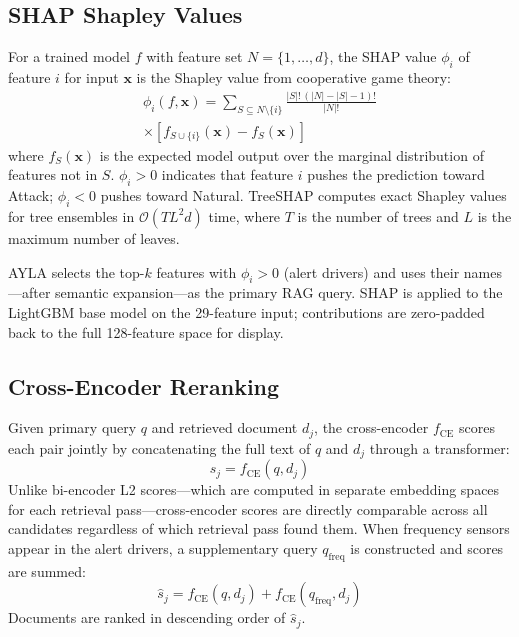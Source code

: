 \documentclass[twocolumn, 10pt, letterpaper]{article}
\begin{document}
\subsection{SHAP Shapley Values}

For a trained model $f$ with feature set $N = \{1, \ldots, d\}$,
the SHAP value $\phi_i$ of feature $i$ for input $\mathbf{x}$ is the
Shapley value from cooperative game theory:
\begin{equation}
\begin{split}
    \phi_i(f, \mathbf{x}) = \sum_{S \subseteq N \setminus \{i\}}
    \frac{|S|!\,(|N|-|S|-1)!}{|N|!} \\
    \times \left[ f_{S \cup \{i\}}(\mathbf{x}) - f_S(\mathbf{x}) \right]
\end{split}
\end{equation}
where $f_S(\mathbf{x})$ is the expected model output over the marginal distribution
of features not in $S$.
$\phi_i > 0$ indicates that feature $i$ pushes the prediction toward Attack;
$\phi_i < 0$ pushes toward Natural.
TreeSHAP \cite{lundberg2020treeshap} computes exact Shapley values for tree
ensembles in $\mathcal{O}(TL^2 d)$ time, where $T$ is the number of trees
and $L$ is the maximum number of leaves.

AYLA selects the top-$k$ features with $\phi_i > 0$ (alert drivers)
and uses their names---after semantic expansion---as the primary RAG query.
SHAP is applied to the LightGBM base model on the 29-feature input;
contributions are zero-padded back to the full 128-feature space for display.

\subsection{Cross-Encoder Reranking}

Given primary query $q$ and retrieved document $d_j$, the cross-encoder
$f_{\text{CE}}$ scores each pair jointly by concatenating the full text of
$q$ and $d_j$ through a transformer:
\begin{equation}
    s_j = f_{\text{CE}}(q, d_j)
\end{equation}
Unlike bi-encoder L2 scores---which are computed in separate embedding spaces
for each retrieval pass---cross-encoder scores are directly comparable across all
candidates regardless of which retrieval pass found them.
When frequency sensors appear in the alert drivers, a supplementary query
$q_{\text{freq}}$ is constructed and scores are summed:
\begin{equation}
    \hat{s}_j = f_{\text{CE}}(q, d_j) + f_{\text{CE}}(q_{\text{freq}}, d_j)
\end{equation}
Documents are ranked in descending order of $\hat{s}_j$.
\end{document}
